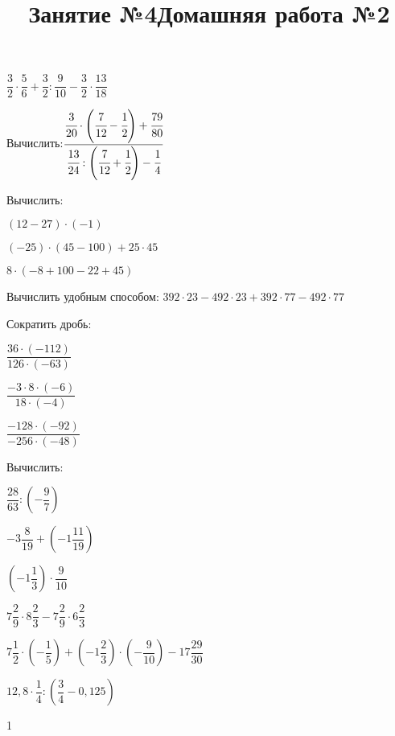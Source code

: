 \begin{listofex}
\begin{enumcols}[itemcolumns=2]
		\item \( \dfrac{3}{2}\cdot\dfrac{5}{6}+\dfrac{3}{2}:\dfrac{9}{10}-\dfrac{3}{2}\cdot\dfrac{13}{18} \)
	\end{enumcols}
	\item Вычислить:\qquad\( \dfrac{\cfrac{3}{20}\cdot\left( \cfrac{7}{12}-\cfrac{1}{2} \right)+\cfrac{79}{80}}{\cfrac{13}{24}:\left( \cfrac{7}{12}+\cfrac{1}{2} \right)-\cfrac{1}{4}} \)
	\item Вычислить:
	\begin{enumcols}[itemcolumns=3]
		\item \( (12-27)\cdot(-1) \)
		\item \( (-25)\cdot(45-100)+25\cdot45 \)
		\item \( 8\cdot(-8+100-22+45) \)
	\end{enumcols}
	\item Вычислить удобным способом: \( 392\cdot23-492\cdot23+392\cdot77-492\cdot77 \)
	\item Сократить дробь:
	\begin{enumcols}[itemcolumns=3]
		\item \( \dfrac{36\cdot(-112)}{126\cdot(-63)} \)
		\item \( \dfrac{-3\cdot8\cdot(-6)}{18\cdot(-4)}\)
		\item \( \dfrac{-128\cdot(-92)}{-256\cdot(-48)} \)
	\end{enumcols}
	\item Вычислить:
	\begin{enumcols}[itemcolumns=2]
		\item \( \dfrac{28}{63}:\left( -\dfrac{9}{7} \right) \)
		\item \( -3\dfrac{8}{19}+\left( -1\dfrac{11}{19} \right) \)
		\item \( \left( -1\dfrac{1}{3} \right)\cdot\dfrac{9}{10} \)
		\item \( 7\dfrac{2}{9}\cdot8\dfrac{2}{3}-7\dfrac{2}{9}\cdot6\dfrac{2}{3} \)
		\item \( 7\dfrac{1}{2}\cdot\left( -\dfrac{1}{5} \right)+\left( -1\dfrac{2}{3} \right)\cdot\left( -\dfrac{9}{10} \right)-17\dfrac{29}{30} \)
		\item \( 12,8\cdot\dfrac{1}{4}:\left( \dfrac{3}{4}-0,125 \right) \)
	\end{enumcols}
\end{listofex}
\newpage
\title{Занятие №4}
\begin{listofex}
	\item 1
\end{listofex}
\newpage
\title{Домашняя работа №2}

